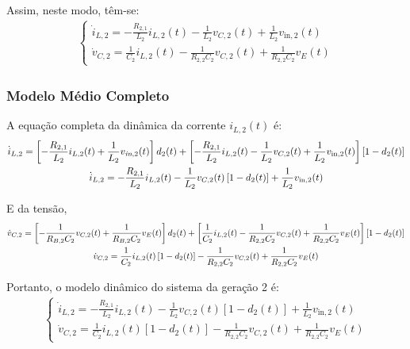 \documentclass{article}
\newcommand{\ds}{\displaystyle}
\newcommand{\nle}{%
  \notag \\[0pt]
}
\begin{document}
Assim, neste modo, têm-se:
\begin{gather}
  \begin{cases}
    \dot i_{L,2} = \ds - \frac{R_{2,1}}{L_2} i_{L,2}(t) - \frac{1}{L_2} v_{C,2}(t) + \frac{1}{L_2} v_{\text{in}, 2}(t) \\[12pt]
    \dot{v}_{C,2} = \ds \frac{1}{C_2} i_{L,2}(t) - \frac{1}{R_{2,2}C_2} v_{C,2}(t) + \frac{1}{R_{2,2} C_2} v_E(t)
  \end{cases}
\end{gather}

\vspace*{8pt}
\subsubsection*{Modelo Médio Completo}
A equação completa da dinâmica da corrente ${i}_{L,2}(t)$ é:
\begin{gather}
  \dot{i}_{L,2} = \left[- \frac{R_{2,1}}{L_2} i_{L,2}(t) + \frac{1}{L_2} v_{\textit{in}, 2}(t)\right] d_2(t) + \left[- \frac{R_{2,1}}{L_2} i_{L,2}(t) - \frac{1}{L_2} v_{C,2}(t) + \frac{1}{L_2} v_{\text{in}, 2}(t)\right] \left[1 - d_2(t)\right] \nle
  \dot{i}_{L,2} = - \frac{R_{2,1}}{L_2} i_{L,2}(t) - \frac{1}{L_2} v_{C,2}(t) \left[1 - d_2(t)\right] + \frac{1}{L_2} v_{\text{in}, 2}(t)
\end{gather}

E da tensão,
\begin{gather}
  \dot{v}_{C,2} = \left[- \frac{1}{R_{B,2} C_2} v_{C,2}(t) + \frac{1}{R_{B,2} C_2} v_{E}(t)\right] d_2(t) + \left[\frac{1}{C_2} i_{L,2}(t) - \frac{1}{R_{2,2} C_2} v_{C,2}(t) + \frac{1}{R_{2,2} C_2} v_E(t)\right] \left[1 - d_2(t)\right] \nle
  \dot{v}_{C,2} = \frac{1}{C_2} i_{L,2}(t) \left[1 - d_2(t)\right] - \frac{1}{R_{2,2} C_2} v_{C,2}(t) + \frac{1}{R_{2,2} C_2} v_E(t)
\end{gather}

Portanto, o modelo dinâmico do sistema da geração 2 é:
\begin{gather}
  \begin{cases}
    \dot{i}_{L,2} =\ds - \frac{R_{2,1}}{L_2} i_{L,2}(t) - \frac{1}{L_2} v_{C,2}(t) \left[1 - d_2(t)\right] + \frac{1}{L_2} v_{\text{in}, 2}(t) \\[12pt]
    \dot{v}_{C,2} =\ds \frac{1}{C_2} i_{L,2}(t) \left[1 - d_2(t)\right] - \frac{1}{R_{2,2} C_2} v_{C,2}(t) + \frac{1}{R_{2,2} C_2} v_E(t)
  \end{cases}
\end{gather}

\vspace*{8pt}
\end{document}
